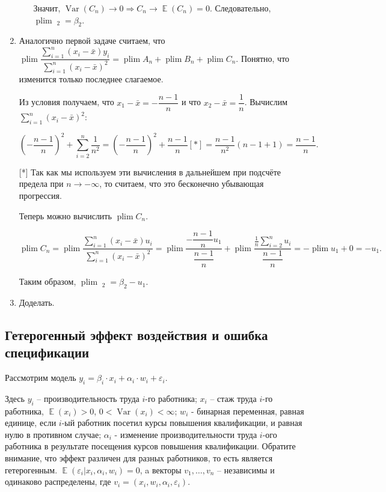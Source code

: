 \documentclass[10pt, a4paper]{extarticle}
\DeclareMathOperator{\E}{\mathbb{E}}
\DeclareMathOperator{\plim}{plim}
\DeclareMathOperator{\Var}{Var}
\DeclareMathOperator{\hb}{\hat{\beta}}
\begin{document}
\begin{enumerate}
\begin{enumerate}
		Значит, $\Var(C_n) \rightarrow 0 \Rightarrow C_n \rightarrow \E(C_n) = 0$. Следовательно, $\plim \hb_2 = \beta_2$.
	\end{enumerate}

	\item
	
	Аналогично первой задаче считаем, что  $\plim \dfrac{\sum_{i = 1}^n(x_i - \bar{x})y_i}{\sum_{i = 1}^n(x_i - \bar{x})^2} = \plim A_n + \plim B_n + \plim C_n$. Понятно, что изменится только последнее слагаемое.
	
	Из условия получаем, что $x_1 - \bar{x} = -\dfrac{n - 1}{n}$ и что $x_2 - \bar{x} = \dfrac{1}{n}$. Вычислим $\sum_{i = 1}^n (x_i - \bar{x})^2$:
	
	\[\left( -\dfrac{n-1}{n} \right)^2 + \sum_{i = 2}^n \dfrac{1}{n^2} = \left( -\dfrac{n-1}{n} \right)^2 + \dfrac{n-1}{n} [*] = \dfrac{n-1}{n^2}(n - 1 + 1)  = \dfrac{n - 1}{n}.\]
	
	[*] Так как мы используем эти вычисления в дальнейшем при подсчёте предела при $n \rightarrow -\infty$, то считаем, что это бесконечно убывающая прогрессия. 
	
	Теперь можно вычислить $\plim C_n$.
	
	$\plim C_n = \plim \dfrac{\sum_{i = 1}^n(x_i - \bar{x})u_i}{\sum_{i = 1}^n(x_i - \bar{x})^2} = 
	\plim \dfrac{-\dfrac{n - 1}{n}u_1}{\dfrac{n-1}{n}} + \plim \dfrac{\frac{1}{n}\sum_{i = 2}^nu_i}{\dfrac{n - 1}{n}} = -\plim u_1 + 0 = -u_1.$
	
	Таким образом, $\plim \hb_2 = \beta_2 - u_1.$
	
	\item Доделать.
	
\end{enumerate}

\subsection{Гетерогенный эффект воздействия и ошибка спецификации}

Рассмотрим модель $y_{i} = \beta_{i} \cdot x_{i} + \alpha_{i} \cdot w_{i} + \varepsilon_{i}$.

Здесь $y_{i}$ -- производительность труда $i$-го работника; $x_{i}$ -- стаж труда $i$-го работника, $\E(x_i)>0$, $0<\Var(x_i)<\infty$; $w_{i}$ - бинарная переменная, равная единице, если $i$-ый работник посетил курсы повышения квалификации, и равная нулю в противном случае; $\alpha_{i}$ - изменение производительности труда $i$-ого работника в результате посещения курсов повышения квалификации. Обратите внимание, что эффект различен для разных работников, то есть является гетерогенным. $\E(\varepsilon_{i}|x_{i}, \alpha_{i}, w_{i})=0$, a векторы $v_{1}, \dots, v_{n}$ -- независимы и одинаково распределены, где $v_{i} = (x_{i}, w_{i}, \alpha_{i}, \varepsilon_{i})$.
\end{document}
